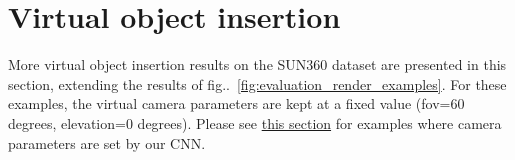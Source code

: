 \begin{multicols}{2}





\end{multicols}

\protect\hypertarget{virtualobjectinsert}{}{}

\hypertarget{virtual-object-insertion}{%
\section{Virtual object
insertion}\label{virtual-object-insertion}}

More virtual object insertion results on the SUN360 dataset are
presented in this section, extending the results of fig..~\ref{fig:evaluation_render_examples}. For these
examples, the virtual camera parameters are kept at a fixed value
(fov=60 degrees, elevation=0 degrees). Please see
\protect\hyperlink{camparaminsertionex}{this section} for examples where
camera parameters are set by our CNN.

